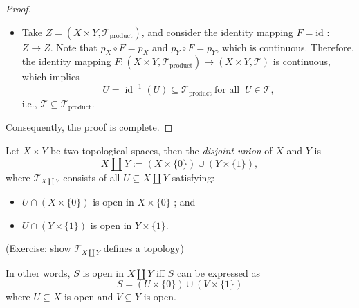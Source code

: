 \begin{proof}
\begin{enumerate}
\begin{itemize}
\item Take \(Z = \left({X \times  Y,{\mathcal{T}}_{\text{product}}}\right)\), and consider the identity mapping \(F = \mathrm{{id}}\) : \(Z \rightarrow  Z\). Note that \(p_X \circ  F = p_X\) and \(p_Y \circ  F = p_Y\), which is continuous. Therefore, the identity mapping \(F : \left({X \times  Y,{\mathcal{T}}_{\text{product}}}\right)  \rightarrow  \left({X \times  Y,\mathcal{T}}\right)\) is continuous, which implies
\[U = {\operatorname{id}}^{-1}\left(U\right)  \subseteq  {\mathcal{T}}_{\text{product}}\ \text{for all }\ U \in  \mathcal{T}\text{,}
\]
i.e., \(\mathcal{T} \subseteq  {\mathcal{T}}_{\text{product}}\).
\end{itemize}
\end{enumerate}
Consequently, the proof is complete. 
\end{proof}


\begin{definition} Let \(X \times  Y\) be two topological spaces, then the \emph{disjoint union} of \(X\) and \(Y\) is
\[
X\coprod Y := \left({X\times \{ 0\}}\right)  \cup  \left({Y\times \{ 1\}}\right),
\]
where \(\mathcal{T}_{X\coprod Y}\) consists of all \(U \subseteq X \coprod  Y\) satisfying:
\begin{itemize}
    \item \(U \cap  \left({X\times \{ 0\}}\right)\) is open in \(X \times  \{ 0\}\) ; and
    \item \(U \cap  \left({Y\times \{ 1\}}\right)\) is open in \(Y \times  \{ 1\}\).
\end{itemize}
(Exercise: show $\mathcal{T}_{X\coprod Y}$ defines a topology)
\end{definition}
In other words, \(S\) is open in \(X \coprod  Y\) iff \(S\) can be expressed as
\[
S = \left({U\times \{ 0\}}\right)  \cup  \left({V\times \{ 1\}}\right)
\]
where \(U \subseteq  X\) is open and \(V \subseteq  Y\) is open.